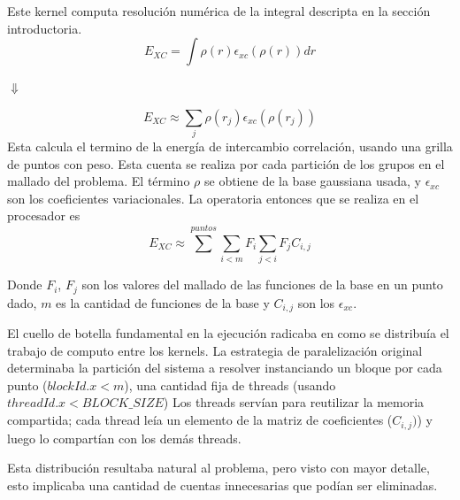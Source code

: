 Este kernel computa resoluci\'on num\'erica de la integral descripta en la secci\'on introductoria.
\begin{equation}
    E_{XC} = \int \rho(r) \epsilon_{xc}\left( \rho(r) \right ) dr
\end{equation}
\begin{center}
    $\Downarrow$
\end{center}
\begin{equation}
    E_{XC} \approx \sum_j \rho(r_j) \epsilon_{xc} (\rho(r_j))
\end{equation}
Esta calcula el termino de la energ\'ia de intercambio correlaci\'on, usando una grilla
de puntos con peso. Esta cuenta se realiza por cada partici\'on de los grupos en el mallado
del problema. El t\'ermino $\rho$ se obtiene de la base gaussiana usada, y $\epsilon_{xc}$
son los coeficientes variacionales. La operatoria entonces que se realiza
en el procesador es
\begin{equation}
  E_{XC} \approx \sum^{puntos} \sum_{i<m} F_i \sum_{j<i} F_j C_{i,j}
\end{equation}

Donde $F_i$, $F_j$ son los valores del mallado de las funciones de la base en un punto dado,
$m$ es la cantidad de funciones de la base y $C_{i,j}$ son los $\epsilon_{xc}$.

El cuello de botella fundamental en la ejecuci\'on radicaba en como se distribu\'ia el trabajo de computo
entre los kernels. La estrategia de paralelizaci\'on original determinaba la partici\'on
del sistema a resolver instanciando un bloque por cada punto ({$blockId.x < m$}),
una cantidad fija de threads (usando $threadId.x < BLOCK\_SIZE$)
Los threads serv\'ian para reutilizar la memoria compartida; cada thread le\'ia un
elemento de la matriz de coeficientes ($C_{i,j})$) y luego lo compart\'ian con los
dem\'as threads.

Esta distribuci\'on resultaba natural al problema, pero visto con mayor detalle, esto
implicaba una cantidad de cuentas innecesarias que pod\'ian ser eliminadas.

